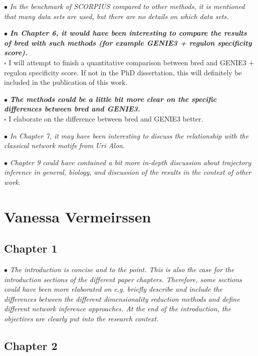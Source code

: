 \documentclass[10pt]{article}
\newcommand{\todo}{$\square$}
\newcommand{\exam}[2][\  ]{\hspace{0pt}\marginpar{\color{myred}#1}$\bullet$ \textit{#2}}
\newcommand{\imp}[1]{\textbf{#1}}
\newcommand{\nimp}[1]{{\color{mygray} #1}}
\newcommand{\task}[2][\todo]{{\color{myblue} #1 #2}}
\newcommand{\bigexclaim}{\raisebox{-0.1em}{\BigTriangleUp}\hspace{-0.32em}\llap{\small\textbf{!}}\hspace{0.32em}}
\newcommand{\tagimp}{\bigexclaim}
\newcommand{\tagtime}{{\Large $\hourglass$}}
\begin{document}
\exam{In the benchmark of SCORPIUS compared to other
methods, it is mentioned that many data sets are used, but there are no details on which data sets.}


\exam[\tagimp \tagtime]{\imp{In Chapter 6, it would have been interesting
to compare the results of bred with such methods (for example GENIE3 + regulon specificity score).}} \\
\task{I will attempt to finish a quantitative comparison between bred and GENIE3 + regulon specificity score. If not in the PhD dissertation, this will definitely be included in the publication of this work.}

\exam[\tagimp \tagtime]{\imp{The methods could be a little bit more clear on the specific differences between bred and GENIE3.}} \\
\task{I elaborate on the difference between bred and GENIE3 better.}

\exam{In Chapter 7, it may have
been interesting to discuss the relationship with the classical network motifs from Uri Alon.}

\exam{Chapter 9 could have
contained a bit more in-depth discussion about trajectory inference in general, biology, and discussion
of the results in the context of other work.}

 


\section{Vanessa Vermeirssen}


\subsection{Chapter 1}

\exam{\nimp{The introduction is concise and to the point. This is also the case for the introduction sections of the
		different paper chapters. Therefore,} some sections could have been more elaborated on e.g. briefly
		describe and include the differences between the different dimensionality reduction methods and
		define different network inference approaches. \nimp{At the end of the introduction, the objectives are
		clearly put into the research context.}}

	

\subsection{Chapter 2}
\end{document}
